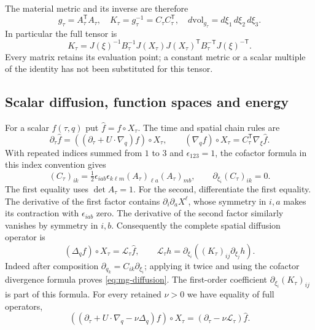 The material metric and its inverse are therefore
\begin{equation}\label{eq:mg-metric}
 g_\tau=A_\tau^{\mathsf T}A_\tau,\quad
 K_\tau=g_\tau^{-1}=C_\tau C_\tau^{\mathsf T},\quad
 d\mathrm{vol}_{g_\tau}=d\xi_1\,d\xi_2\,d\xi_3.
\end{equation}
In particular the full tensor is
\[
 K_\tau=J(\xi)^{-1}B_\tau^{-1}J(X_\tau)J(X_\tau)^{\mathsf T}
 B_\tau^{-\mathsf T}J(\xi)^{-\mathsf T}.
\]
Every matrix retains its evaluation point; a constant metric or a scalar
multiple of the identity has not been substituted for this tensor.

\subsection{Scalar diffusion, function spaces and energy}

For a scalar $f(\tau,q)$ put $\widehat f=f\circ X_\tau$.
The time and spatial chain rules are
\begin{equation}\label{eq:mg-chain}
 \partial_\tau\widehat f=((\partial_\tau+U\cdot\nabla_q)f)\circ X_\tau,
 \qquad
 (\nabla_qf)\circ X_\tau=C_\tau^{\mathsf T}\nabla_\xi\widehat f.
\end{equation}
With repeated indices summed from $1$ to $3$ and $\epsilon_{123}=1$,
the cofactor formula in this index convention gives
\[
 (C_\tau)_{ik}=\tfrac12\epsilon_{iab}\epsilon_{k\ell m}
 (A_\tau)_{\ell a}(A_\tau)_{mb},\qquad
 \partial_{\xi_i}(C_\tau)_{ik}=0.
\]
The first equality uses $\det A_\tau=1$. For the second, differentiate
the first equality. The derivative of the first factor contains
$\partial_i\partial_aX^\ell$, whose symmetry in $i,a$ makes its
contraction with $\epsilon_{iab}$ zero. The derivative of the second
factor similarly vanishes by symmetry in $i,b$.
Consequently the complete spatial diffusion operator is
\begin{equation}\label{eq:mg-diffusion}
 (\Delta_qf)\circ X_\tau=\mathcal L_\tau\widehat f,\qquad
 \mathcal L_\tau h=\partial_{\xi_i}
                    ((K_\tau)_{ij}\partial_{\xi_j}h).
\end{equation}
Indeed after composition $\partial_{q_k}=C_{ik}\partial_{\xi_i}$;
applying it twice and using the cofactor divergence formula proves
\eqref{eq:mg-diffusion}. The first-order coefficient
$\partial_{\xi_i}(K_\tau)_{ij}$ is part of this formula.
For every retained $\nu>0$ we have equality of full operators,
\[
 ((\partial_\tau+U\cdot\nabla_q-\nu\Delta_q)f)\circ X_\tau
 =(\partial_\tau-\nu\mathcal L_\tau)\widehat f.
\]

